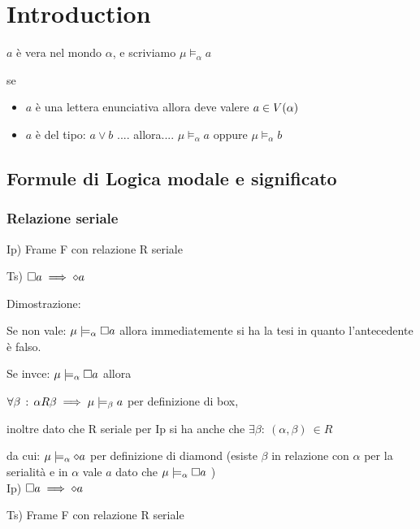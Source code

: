 
\chapter{Introduction}

$a$ è vera nel mondo $\alpha$, e scriviamo $\mu\models_{\alpha}a$

se 
\begin{itemize}
\item $a$ è una lettera enunciativa allora deve valere $a\in V(\alpha)$ 
\item $a$ è del tipo: $a\lor b$ .... allora.... $\mu\models_{\alpha}a$
oppure $\mu\models_{\alpha}b$ 
\end{itemize}

\section{Formule di Logica modale e significato}


\subsection{Relazione seriale}

Ip) Frame F con relazione R seriale

Ts) $\square a\implies\diamond a$

Dimostrazione:

Se non vale: $\mu\models_{\alpha}\square a$ allora immediatemente si
ha la tesi in quanto l'antecedente è falso.

Se invce: $\mu\models_{\alpha}\square a$ allora

$\forall\beta\,:\,\alpha R\beta\implies\mu\models_{\beta}a$ per definizione
di box,

inoltre dato che R seriale per Ip si ha anche che $\exists\beta:\:(\alpha,\beta)\:\in R$

da cui: $\mu\models_{\alpha}\diamond a$ per definizione di diamond (esiste
$\beta$ in relazione con $\alpha$ per la serialità e in $\alpha$
vale $a$ dato che $\mu\models_{\alpha}\square a$ )\\


Ip) $\square a\implies\diamond a$

Ts) Frame F con relazione R seriale

\begin{center}
$ $\begin{center}  
 \end{center}
\par\end{center}

